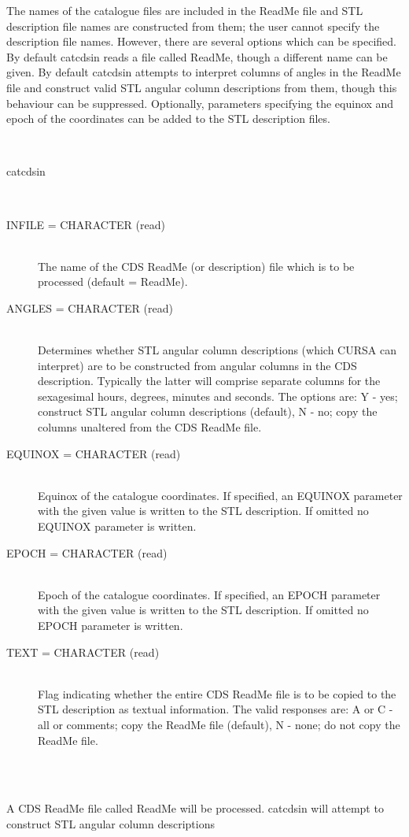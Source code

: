 \documentclass[twoside,11pt]{article}
\renewcommand{\_}{\texttt{\symbol{95}}}
\newlength{\sstexampleslength}
\newcommand{\sstusage}[1]{\item[Usage:] \mbox{}
\\[1.3ex]{\raggedright \ssttt #1}}
\newcommand{\sstparameters}[1]{
   \item[Parameters:] \mbox{} \\
   \vspace{-3.5ex}
   \begin{description}
      #1
   \end{description}
}
\newcommand{\sstexamples}[1]{
   \item[Examples:] \mbox{} \\
   \vspace{-3.5ex}
   \begin{description}
      #1
   \end{description}
}
\newcommand{\sstsubsection}[1]{ \item[{#1}] \mbox{} \\}
\newcommand{\sstexamplesubsection}[2]{\sloppy
\item[\parbox{\sstexampleslength}{\ssttt #1}] \mbox{} \vspace{1.0ex}
\\ #2 }
\newcommand{\sstusage}[1]{\item[Usage:]
      \begin{description}
         {\ssttt #1}
      \end{description}
      \\
   }
\newcommand{\sstparameters}[1]{
      \item[Parameters:] \\
      \begin{description}
         #1
      \end{description}
      \\
   }
\newcommand{\sstexamples}[1]{
      \item[Examples:] \\
      \begin{description}
         #1
      \end{description}
      \\
   }
\newcommand{\sstsubsection}[1]{\item[{#1}]}
\newcommand{\sstexamplesubsection}[2]{\item[{\ssttt #1}] #2}
\begin{document}
\begin{htmlonly}
{{      The names of the catalogue files are included in the ReadMe
      file and STL description file names are constructed from them;
      the user cannot specify the description file names.  However,
      there are several options which can be specified.  By default
      catcdsin reads a file called ReadMe, though a different name can
      be given.  By default catcdsin attempts to interpret columns
      of angles in the ReadMe file and construct valid STL angular
      column descriptions from them, though this behaviour can be
      suppressed.  Optionally, parameters specifying the equinox and
      epoch of the coordinates can be added to the STL description
      files.
   }
   \sstusage{
      catcdsin
   }
   \sstparameters{
      \sstsubsection{
         INFILE  =  CHARACTER  (read)
      }{
         The name of the CDS ReadMe (or description) file which is
         to be processed (default = ReadMe).
      }
      \sstsubsection{
         ANGLES  =  CHARACTER  (read)
      }{
         Determines whether STL angular column descriptions (which
         CURSA can interpret) are to be constructed from angular
         columns in the CDS description.  Typically the latter will
         comprise separate columns for the sexagesimal hours, degrees,
         minutes and seconds.  The options are:
         Y  -  yes; construct STL angular column descriptions (default),
         N  -  no; copy the columns unaltered from the CDS ReadMe file.
      }
      \sstsubsection{
         EQUINOX  =  CHARACTER  (read)
      }{
         Equinox of the catalogue coordinates.  If specified, an EQUINOX
         parameter with the given value is written to the STL description.
         If omitted no EQUINOX parameter is written.
      }
      \sstsubsection{
         EPOCH  =  CHARACTER  (read)
      }{
         Epoch of the catalogue coordinates.  If specified, an EPOCH
         parameter with the given value is written to the STL description.
         If omitted no EPOCH parameter is written.
      }
      \sstsubsection{
         TEXT  =  CHARACTER  (read)
      }{
         Flag indicating whether the entire CDS ReadMe file is to be
         copied to the STL description as textual information.  The
         valid responses are:
         A or C -  all or comments; copy the ReadMe file (default),
         N  -  none; do not copy the ReadMe file.
      }
   }
   \sstexamples{
      \sstexamplesubsection{
         catcdsin
      }{
         A CDS ReadMe file called ReadMe will be processed.  catcdsin
         will attempt to construct STL angular column descriptions
}}}
\end{htmlonly}
\end{document}
